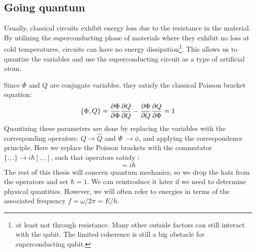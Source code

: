 
\subsection{Going quantum}
 Usually, classical circuits exhibit energy loss due to the resistance in the material. By utilizing the superconducting phase of materials where they exhibit no loss at cold temperatures, circuits can have no energy dissipation\footnote{at least not through resistance. Many other outside factors can still interact with the qubit. The limited coherence is still a big obstacle for superconducting qubit.}. This allows us to quantize the variables and use the superconducting circuit as a type of artificial atom. \cite{gennes}

Since $\Phi$ and $Q$ are conjugate variables, they satisfy the classical Poisson bracket equation:
\begin{equation}
    \{ \Phi, Q\} = \frac{\partial \Phi}{\partial \Phi}\frac{\partial Q}{\partial Q} - \frac{\partial \Phi}{\partial Q}\frac{\partial Q}{\partial \Phi} = 1
\end{equation}
Quantizing these parameters are done by replacing the variables with the corresponding operators: $Q \to \hat{Q}$ and $\Phi \ \to \phi$, and applying the correspondence principle. Here we replace the Poisson brackets with the commutator $\{., .\} \to i\hbar[., .]$, such that operators satisfy \cite{krantz_quantum_2019}:
\begin{equation}
    [\phi, \hat{Q}] = i\hbar
\end{equation}
The rest of this thesis will concern quantum mechanics, so we drop the hats from the operators and set $\hbar = 1$. We can reintroduce it later if we need to determine physical quantities. However, we will often refer to energies in terms of the associated frequency $f = \omega/2\pi = E / h$. 


